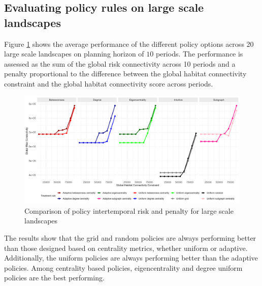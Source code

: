 \FloatBarrier

\subsection{Evaluating policy rules on large scale landscapes }
\label{sec:evaluating_policy}
Figure \ref{fig:comparison_policies} shows the average performance of the different policy options across 20 large scale landscapes on planning horizon of $10$ periods. The performance is assessed as the sum of the global risk connectivity across 10 periods and a penalty proportional to the difference between the global habitat connectivity constraint and the global habitat connectivity score across periods. 

\begin{figure}[h]
	\includegraphics[width=.8\textwidth]{figures/wildland/comparing_performances.jpg}
\caption{Comparison of policy intertemporal risk and penalty for large scale landscapes}
	\label{fig:comparison_policies}
\end{figure}

The results show that the grid and random policies are always performing better than those designed based on centrality metrics, whether uniform or adaptive. Additionally, the uniform policies are always performing better than the adaptive policies.  Among centrality based policies, eigencentrality and degree uniform policies are the best performing.




